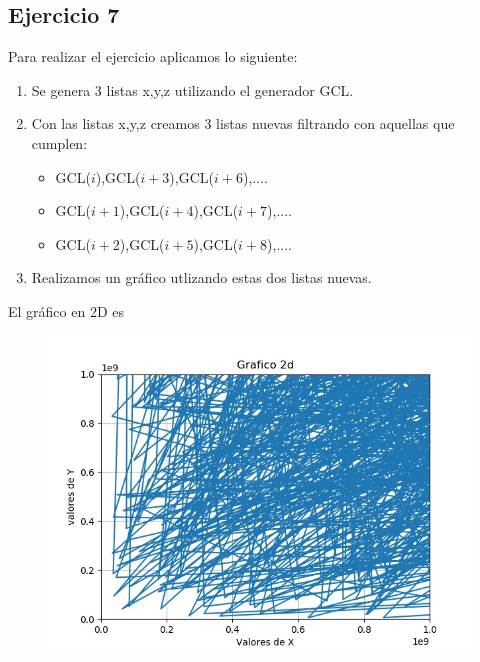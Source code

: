 \documentclass[11pt,a4paper]{article}
\begin{document}
	\subsection{Ejercicio 7}
        	Para realizar el ejercicio aplicamos lo siguiente:
	    \begin{enumerate}
	        \item Se genera 3 listas x,y,z utilizando el generador GCL.
	        \item Con las listas x,y,z creamos 3 listas nuevas filtrando con aquellas que cumplen:
		\begin{itemize}
			\item GCL($i$),GCL($i+3$),GCL($i+6$),....
			\item GCL($i+1$),GCL($i+4$),GCL($i+7$),....
			\item GCL($i+2$),GCL($i+5$),GCL($i+8$),....
		\end{itemize}


	        \item Realizamos un gráfico utlizando estas dos listas nuevas.
	        
		
	   \end{enumerate}
		El gráfico en 2D es 
		\begin{figure}[H]
  			\centering
    			\includegraphics[width=14cm]{imagenes/histogramaEjer72d}
		\end{figure}
\end{document}
